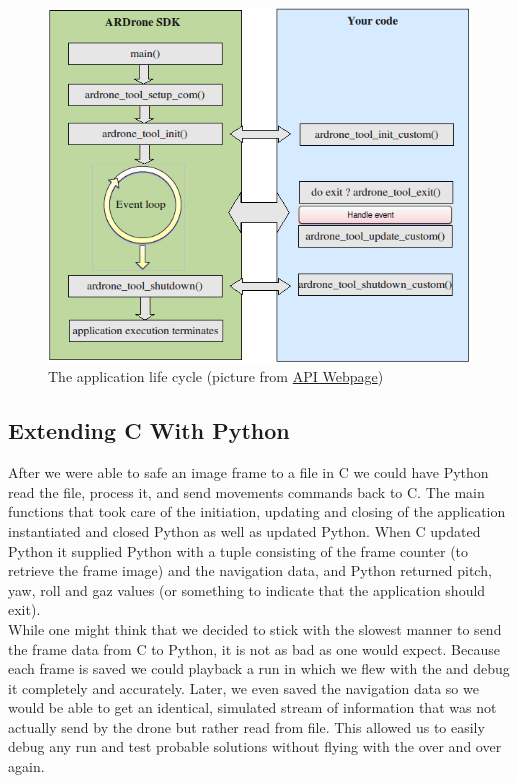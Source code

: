 \begin{figure}[h!]
    \centering
        \includegraphics[scale=0.5]{mainloop.png}
    \caption{The application life cycle (picture from \href{https://projects.ardrone.org/embedded/ardrone-api/index.html}{\Ardrone API Webpage})}
    \label{mainloop}
\end{figure}

\subsection{Extending C With Python}
After we were able to safe an image frame to a file in C we could have Python read the file, process it, and send movements commands back to C. The main functions 
that took care of the initiation, updating and closing of the application instantiated and closed Python as well as updated Python. When C updated Python it supplied
Python with a tuple consisting of the frame counter (to retrieve the frame image) and the navigation data, and Python returned pitch, yaw, roll and gaz values (or something
to indicate that the application should exit). \\

While one might think that we decided to stick with the slowest manner to send the frame data from C to Python, it is not as bad as one would expect. Because each frame is
saved we could playback a run in which we flew with the \Ardrone and debug it completely and accurately. Later, we even saved the navigation data so we would be able to 
get an identical, simulated stream of information that was not actually send by the drone but rather read from file. This allowed us to easily debug any run and test 
probable solutions without flying with the \Ardrone over and over again. \\

